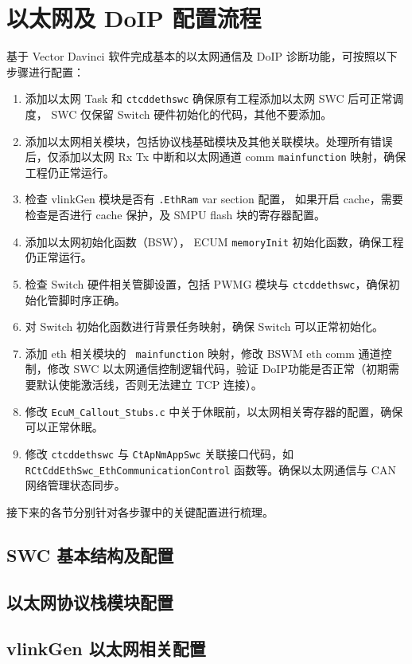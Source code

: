 \section{以太网及 DoIP 配置流程}

基于 Vector Davinci 软件完成基本的以太网通信及 DoIP 诊断功能，可按照以下步骤进行配置：

\begin{enumerate}
    \item 添加以太网 Task 和 \lstinline{ctcddethswc} 确保原有工程添加以太网 SWC 后可正常调度， SWC 仅保留 Switch 硬件初始化的代码，其他不要添加。
    \item 添加以太网相关模块，包括协议栈基础模块及其他关联模块。处理所有错误后，仅添加以太网 Rx Tx 中断和以太网通道 comm \lstinline{mainfunction} 映射，确保工程仍正常运行。
    \item 检查 vlinkGen 模块是否有 \lstinline{.EthRam} var section 配置， 如果开启 cache，需要检查是否进行 cache 保护，及 SMPU flash 块的寄存器配置。
    \item 添加以太网初始化函数（BSW）， ECUM \lstinline{memoryInit} 初始化函数，确保工程仍正常运行。
    \item 检查 Switch 硬件相关管脚设置，包括 PWMG 模块与 \lstinline{ctcddethswc}，确保初始化管脚时序正确。
    \item 对 Switch 初始化函数进行背景任务映射，确保 Switch 可以正常初始化。
    \item 添加 eth 相关模块的 \lstinline{ mainfunction} 映射，修改 BSWM eth comm 通道控制，修改 SWC 以太网通信控制逻辑代码，验证 DoIP功能是否正常（初期需要默认使能激活线，否则无法建立 TCP 连接）。
    \item 修改 \lstinline{EcuM_Callout_Stubs.c} 中关于休眠前，以太网相关寄存器的配置，确保可以正常休眠。
    \item 修改 \lstinline{ctcddethswc} 与 \lstinline{CtApNmAppSwc} 关联接口代码，如 \lstinline{RCtCddEthSwc_EthCommunicationControl} 函数等。确保以太网通信与 CAN 网络管理状态同步。
\end{enumerate} 

接下来的各节分别针对各步骤中的关键配置进行梳理。

\subsection{SWC 基本结构及配置}
\subsection{以太网协议栈模块配置}
\subsection{vlinkGen 以太网相关配置}

